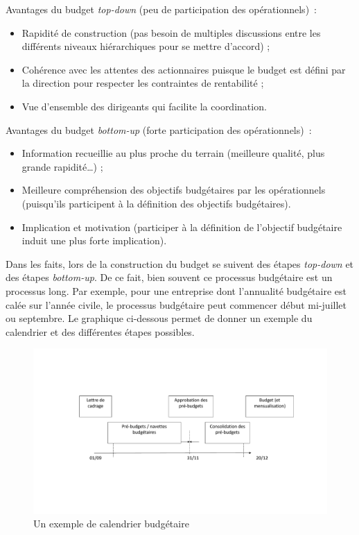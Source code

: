 \documentclass[oneside]{kaobook}
\begin{document}
\begin{kaobox}
Avantages du budget \emph{top-down} (peu de participation des opérationnels) :
\begin{itemize}
\item Rapidité de construction (pas besoin de multiples discussions entre les différents niveaux hiérarchiques pour se mettre d'accord) ;
\item Cohérence avec les attentes des actionnaires puisque le budget est défini par la direction pour respecter les contraintes de rentabilité ;
\item Vue d'ensemble des dirigeants qui facilite la coordination.
\end{itemize}
Avantages du budget \emph{bottom-up} (forte participation des opérationnels) : 
\begin{itemize}
\item Information recueillie au plus proche du terrain (meilleure qualité, plus grande rapidité\ldots{}) ;
\item Meilleure compréhension des objectifs budgétaires par les opérationnels (puisqu'ils participent à la définition des objectifs budgétaires).
\item Implication et motivation (participer à la définition de l'objectif budgétaire induit une plus forte implication).
\end{itemize}
\end{kaobox}

Dans les faits, lors de la construction du budget se suivent des étapes \emph{top-down} et des étapes \emph{bottom-up}. De ce fait, bien souvent ce processus budgétaire est un processus long. Par exemple, pour une entreprise dont l'annualité budgétaire est calée sur l'année civile, le processus budgétaire peut commencer début mi-juillet ou septembre. Le graphique ci-dessous permet de donner un exemple du calendrier et des différentes étapes possibles.

\begin{figure}[H]

\includegraphics{./img/budgetcal.pdf}
\caption{Un exemple de calendrier budgétaire}
\end{figure}
\end{document}
